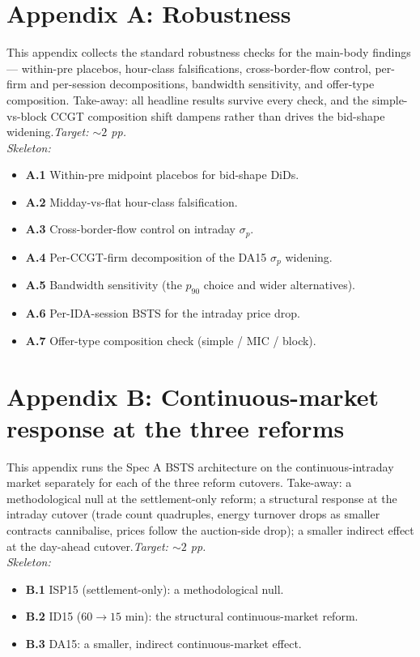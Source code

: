 \documentclass[11pt]{article}
\begin{document}
\section*{Appendix A: Robustness}

This appendix collects the standard robustness checks for the main-body findings --- within-pre placebos, hour-class falsifications, cross-border-flow control, per-firm and per-session decompositions, bandwidth sensitivity, and offer-type composition. Take-away: all headline results survive every check, and the simple-vs-block CCGT composition shift dampens rather than drives the bid-shape widening.\hfill\emph{Target: $\sim 2$ pp.}
\\\emph{Skeleton:}
\begin{itemize}
  \item \textbf{A.1} Within-pre midpoint placebos for bid-shape DiDs.
  \item \textbf{A.2} Midday-vs-flat hour-class falsification.
  \item \textbf{A.3} Cross-border-flow control on intraday $\sigma_p$.
  \item \textbf{A.4} Per-CCGT-firm decomposition of the DA15 $\sigma_p$ widening.
  \item \textbf{A.5} Bandwidth sensitivity (the $p_{90}$ choice and wider alternatives).
  \item \textbf{A.6} Per-IDA-session BSTS for the intraday price drop.
  \item \textbf{A.7} Offer-type composition check (simple / MIC / block).
\end{itemize}

\section*{Appendix B: Continuous-market response at the three reforms}

This appendix runs the Spec A BSTS architecture on the continuous-intraday market separately for each of the three reform cutovers. Take-away: a methodological null at the settlement-only reform; a structural response at the intraday cutover (trade count quadruples, energy turnover drops as smaller contracts cannibalise, prices follow the auction-side drop); a smaller indirect effect at the day-ahead cutover.\hfill\emph{Target: $\sim 2$ pp.}
\\\emph{Skeleton:}
\begin{itemize}
  \item \textbf{B.1} ISP15 (settlement-only): a methodological null.
  \item \textbf{B.2} ID15 ($60\to15$ min): the structural continuous-market reform.
  \item \textbf{B.3} DA15: a smaller, indirect continuous-market effect.
\end{itemize}
\end{document}
